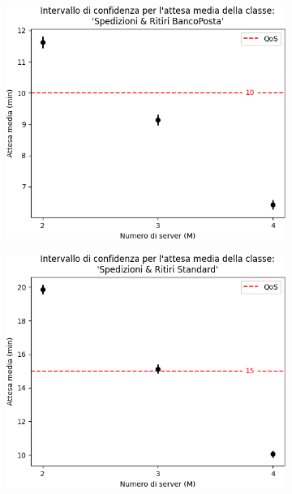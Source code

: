 \documentclass[
	usepdftitle=false,
	xcolor={table, dvipsnames},
	hyperref={
		pdftitle={Studio delle prestazioni di un Ufficio Postale ispirato a Poste Italiane},
    	pdfauthor={A. Chillotti, C. Cuffaro e S. Tiberi}
    }
]{beamer}
\begin{document}
\begin{frame}
\begin{figure}[ht]
\begin{subfigure}[b]{0.3\textwidth}
\includegraphics[width=\textwidth]{plots/d4-trans-imp}
\end{subfigure}
\begin{subfigure}[b]{0.3\textwidth}   
\centering 
\includegraphics[width=\textwidth]{plots/d5-trans-imp}
\end{subfigure}
\end{figure}
\end{frame}
\end{document}
